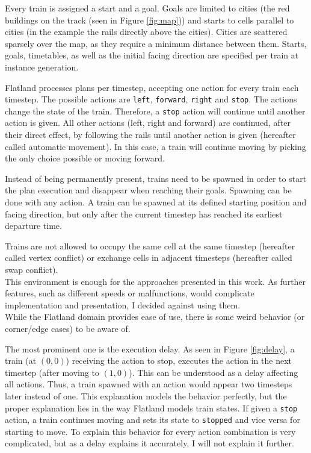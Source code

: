 \documentclass{llncs}
\begin{document}
\begin{multicols*}{2}
Every train is assigned a start and a goal. Goals are limited to cities (the red buildings on the track (seen in Figure \ref{fig:map})) and starts to cells parallel to cities (in the example the rails directly above the cities). Cities are scattered sparsely over the map, as they require a minimum distance between them. Starts, goals, timetables, as well as the initial facing direction are specified per train at instance generation.

Flatland processes plans per timestep, accepting one action for every train each timestep. The possible actions are \texttt{left}, \texttt{forward}, \texttt{right} and \texttt{stop}. The actions change the state of the train. Therefore, a \texttt{stop} action will continue until another action is given. All other actions (left, right and forward) are continued, after their direct effect, by following the rails until another action is given (hereafter called automatic movement). In this case, a train will continue moving by picking the only choice possible or moving forward.

Instead of being permanently present, trains need to be spawned in order to start the plan execution and disappear when reaching their goals. Spawning can be done with any action. A train can be spawned at its defined starting position and facing direction, but only after the current timestep has reached its earliest departure time.

Trains are not allowed to occupy the same cell at the same timestep (hereafter called vertex conflict) or exchange cells in adjacent timesteps (hereafter called swap conflict).\\

This environment is enough for the approaches presented in this work. As further features, such as different speeds or malfunctions, would complicate implementation and presentation, I decided against using them.\\

While the Flatland domain provides ease of use, there is some weird behavior (or corner/edge cases) to be aware of.

The most prominent one is the execution delay. As seen in Figure \ref{fig:delay}, a train (at $(0,0)$) receiving the action to stop, executes the action in the next timestep (after moving to $(1,0)$). This can be understood as a delay affecting all actions. Thus, a train spawned with an action would appear two timesteps later instead of one. This explanation models the behavior perfectly, but the proper explanation lies in the way Flatland models train states. If given a \texttt{stop} action, a train continues moving and sets its state to \texttt{stopped} and vice versa for starting to move. To explain this behavior for every action combination is very complicated, but as a delay explains it accurately, I will not explain it further.


\end{multicols*}
\end{document}
